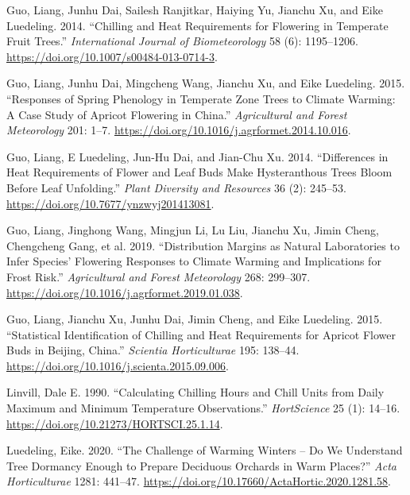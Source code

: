 \documentclass[
]{book}
\begin{document}
\leavevmode\hypertarget{ref-guo2014chilling}{}%
Guo, Liang, Junhu Dai, Sailesh Ranjitkar, Haiying Yu, Jianchu Xu, and Eike Luedeling. 2014. ``Chilling and Heat Requirements for Flowering in Temperate Fruit Trees.'' \emph{International Journal of Biometeorology} 58 (6): 1195--1206. \url{https://doi.org/10.1007/s00484-013-0714-3}.

\leavevmode\hypertarget{ref-guo2015responses}{}%
Guo, Liang, Junhu Dai, Mingcheng Wang, Jianchu Xu, and Eike Luedeling. 2015. ``Responses of Spring Phenology in Temperate Zone Trees to Climate Warming: A Case Study of Apricot Flowering in China.'' \emph{Agricultural and Forest Meteorology} 201: 1--7. \url{https://doi.org/10.1016/j.agrformet.2014.10.016}.

\leavevmode\hypertarget{ref-guo2014differences}{}%
Guo, Liang, E Luedeling, Jun-Hu Dai, and Jian-Chu Xu. 2014. ``Differences in Heat Requirements of Flower and Leaf Buds Make Hysteranthous Trees Bloom Before Leaf Unfolding.'' \emph{Plant Diversity and Resources} 36 (2): 245--53. \url{https://doi.org/10.7677/ynzwyj201413081}.

\leavevmode\hypertarget{ref-guo2019distribution}{}%
Guo, Liang, Jinghong Wang, Mingjun Li, Lu Liu, Jianchu Xu, Jimin Cheng, Chengcheng Gang, et al. 2019. ``Distribution Margins as Natural Laboratories to Infer Species' Flowering Responses to Climate Warming and Implications for Frost Risk.'' \emph{Agricultural and Forest Meteorology} 268: 299--307. \url{https://doi.org/10.1016/j.agrformet.2019.01.038}.

\leavevmode\hypertarget{ref-guo2015statistical}{}%
Guo, Liang, Jianchu Xu, Junhu Dai, Jimin Cheng, and Eike Luedeling. 2015. ``Statistical Identification of Chilling and Heat Requirements for Apricot Flower Buds in Beijing, China.'' \emph{Scientia Horticulturae} 195: 138--44. \url{https://doi.org/10.1016/j.scienta.2015.09.006}.

\leavevmode\hypertarget{ref-linvill1990calculating}{}%
Linvill, Dale E. 1990. ``Calculating Chilling Hours and Chill Units from Daily Maximum and Minimum Temperature Observations.'' \emph{HortScience} 25 (1): 14--16. \url{https://doi.org/10.21273/HORTSCI.25.1.14}.

\leavevmode\hypertarget{ref-luedeling_IHC_adapt_2020}{}%
Luedeling, Eike. 2020. ``The Challenge of Warming Winters -- Do We Understand Tree Dormancy Enough to Prepare Deciduous Orchards in Warm Places?'' \emph{Acta Horticulturae} 1281: 441--47. \url{https://doi.org/10.17660/ActaHortic.2020.1281.58}.
\end{document}
